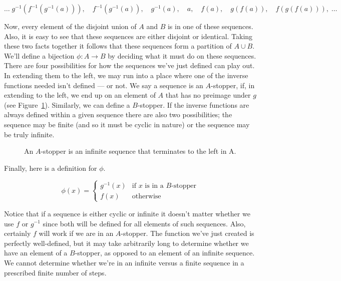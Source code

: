 \[
\ldots \; g^{-1}(f^{-1}(g^{-1}(a))), \quad f^{-1}(g^{-1}(a)), \quad g^{-1}(a), \quad a, \quad  f(a), \quad  g(f(a)), \quad f(g(f(a))),\; \ldots \]

Now, every element of the disjoint union of $A$ and $B$ is in one of these
sequences.  Also, it is easy to see that these sequences are either disjoint
or identical.  Taking these two facts together it follows that these sequences
form a partition of $A \cup B$.  We'll define a bijection  
$\phi : A \longrightarrow B$ by deciding what it must do on these 
sequences.  There are four possibilities for how the sequences we've 
just defined can play out.  In extending them to the left, we may run 
into a place where one of the inverse functions needed isn't 
defined --- or not.  We say a sequence is an 
$A$-stopper, if, in extending to the left, we end 
up on an element of $A$ that has
no preimage under $g$ (see Figure~\ref{fig:A-stopper}).  Similarly, 
we can define a $B$-stopper.
If the inverse functions are always defined within a given sequence there are
also two possibilities; the sequence may be finite (and so it must be cyclic in
nature) or the sequence may be truly infinite.

\begin{figure}[!hbtp]
\begin{center}

\end{center}
\caption[An \emph{A}-stopper in the proof of C-B-S.]{An $A$-stopper
is an infinite sequence that terminates to the left in A.}
\label{fig:A-stopper} 
\end{figure}


Finally, here is a definition for $\phi$.

\[ \phi(x) =  \left\{ \begin{array}{cl} g^{-1}(x) & \mbox{if $x$ is in a $B$-stopper} \\ f(x) & \mbox{otherwise} \end{array} \right. \]

Notice that if a sequence is either cyclic or infinite it doesn't matter
whether we use $f$ or $g^{-1}$ since both will be 
defined for all elements of such
sequences.  Also, certainly $f$ will work if we are in an $A$-stopper.  
The function  we've just created is perfectly well-defined, but it may take
arbitrarily long to determine whether we have an element of a $B$-stopper, as
opposed to an element of an infinite sequence.  We cannot determine whether
we're in an infinite versus a finite sequence in a prescribed finite number of
steps.


